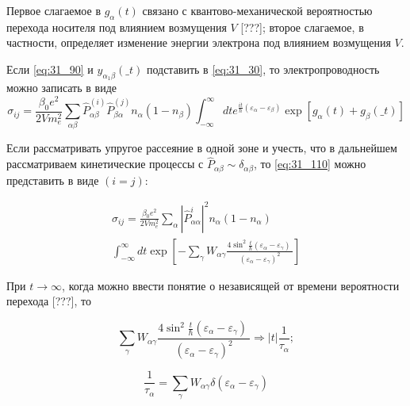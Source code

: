 \noindent Первое слагаемое в $g_{\alpha }\left(t\right)$ связано с квантово-механической вероятностью перехода носителя под влиянием возмущения $V$ [{\color{red}???}]; второе слагаемое, в частности, определяет изменение энергии электрона под влиянием возмущения $V$.

\noindent Если \eqref{eq:31_90} и $y_{{\alpha }_1\beta }\left(\_t\right)$ подставить в \eqref{eq:31_30}, то электропроводность можно записать в виде
\begin{equation} \label{eq:31_110}
{\sigma }_{ij}=\frac{{\beta }_0e^2}{2Vm^2_e}\sum_{\alpha \beta }{{\hat{P}}^{\left(i\right)}_{\alpha \beta }{\hat{P}}^{\left(j\right)}_{\beta \alpha }n_{\alpha }\left(1-n_{\beta }\right)}\int^{\infty }_{-\infty }{d te^{\frac{it}{\hbar }\left({\varepsilon }_{\alpha }-{\varepsilon }_{\beta }\right)}\exp \left[g_{\alpha }\left(t\right)+g_{\beta }\left(\_t\right)\right]}
\end{equation} 

\noindent Если рассматривать упругое рассеяние в одной зоне и учесть, что в дальнейшем рассматриваем кинетические процессы с ${\hat{P}}_{\alpha \beta }\sim {\delta }_{\alpha \beta }$, то \eqref{eq:31_110} можно представить в виде $(i=j)$:

\begin{multline} \label{eq:31_120}
{\sigma }_{ij}=\frac{{\beta }_0e^2}{2Vm^2_e}\sum_{\alpha }{{\left|{\hat{P}}^i_{\alpha \alpha }\right|}^2 n_{\alpha }\left(1-n_{\alpha }\right)}\\
\int^{\infty }_{-\infty }{d t{\exp \left[-\sum_{\gamma }{W_{\alpha \gamma }\frac{4{{\sin}^2 \frac{t}{\hbar }\left({\varepsilon }_{\alpha }-{\varepsilon }_{\gamma }\right)\ }}{{\left({\varepsilon }_{\alpha }-{\varepsilon }_{\gamma }\right)}^2}}\right]}}
\end{multline}

\noindent При $t\to \infty $, {\color{red}когда можно ввести понятие о независящей от времени вероятности перехода [???]}, то

\begin{equation} \label{eq:31_130}
\sum_{\gamma }{W_{\alpha \gamma }\frac{4{{\sin}^2 \frac{t}{\hbar }\left({\varepsilon }_{\alpha }-{\varepsilon }_{\gamma }\right)\ }}{{\left({\varepsilon }_{\alpha }-{\varepsilon }_{\gamma }\right)}^2}}\Rightarrow \left|t\right|\frac{1}{{\tau }_{\alpha }};
\end{equation}
 
\begin{equation} \label{eq:31_140}
\frac{1}{{\tau }_{\alpha }}=\sum_{\gamma }{W_{\alpha \gamma }\delta \left({\varepsilon }_{\alpha }-{\varepsilon }_{\gamma }\right)}
\end{equation}


